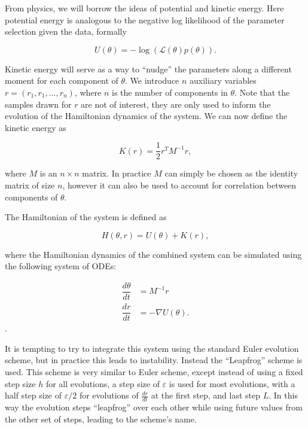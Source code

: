     From physics, we will borrow the ideas of potential and kinetic energy. Here potential energy is analogous to the negative log likelihood of the parameter selection given the data, formally

    \begin{equation}
        U(\theta) = -\log(\mathcal{L}(\theta)p(\theta)).
    \end{equation}

    Kinetic energy will serve as a way to ``nudge'' the parameters along a different moment for each component of $\theta$. We introduce $n$ auxiliary variables $r = (r_1, r_1,...,r_n)$, where $n$ is the number of components in $\theta$. Note that the samples drawn for $r$ are not of interest, they are only used to inform the evolution of the Hamiltonian dynamics of the system. We can now define the kinetic energy as

    \begin{equation}
        K(r) = \frac{1}{2} r^T M^{-1} r,
    \end{equation}

    where $M$ is an $n \times n$ matrix. In practice $M$ can simply be chosen as the identity matrix of size $n$, however it can also be used to account for correlation between components of $\theta$.

    The Hamiltonian of the system is defined as

    \begin{equation}
        H(\theta,r) = U(\theta) + K(r),
    \end{equation}

    where the Hamiltonian dynamics of the combined system can be simulated using the following system of ODEs:

    \begin{equation}
        \begin{array}{rl}
        \displaystyle
            \dfrac{d\theta}{dt} & = M^{-1} r \\
            \dfrac{dr}{dt} & = - \nabla U(\theta) .
        \end{array}
    \end{equation}.

    It is tempting to try to integrate this system using the standard Euler evolution scheme, but in practice this leads to instability. Instead the ``Leapfrog'' scheme is used. This scheme is very similar to Euler scheme, except instead of using a fixed step size $h$ for all evolutions, a step size of $\varepsilon$ is used for most evolutions, with a half step size of $\varepsilon / 2$ for evolutions of $\frac{dr}{dt}$ at the first step, and last step $L$. In this way the evolution steps ``leapfrog'' over each other while using future values from the other set of steps, leading to the scheme's name.

